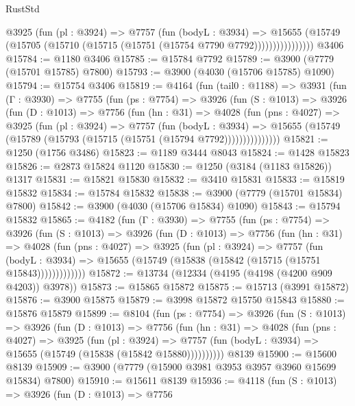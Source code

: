 \begin{lexlean}{RustStd}
\begin{coremodule}
                  @3925
                    (fun (pl : @3924) =>
                    @7757
                      (fun (bodyL : @3934) =>
                      @15655
                        (@15749 (@15705 (@15710 (@15715 (@15751 (@15754 @7790 @7792))))))))))))))))
    @3406
@15784 := @1180 @3406
@15785 := @15784 @7792
@15789 := @3900 (@7779 (@15701 @15785) @7800)
@15793 := @3900 (@4030 (@15706 @15785) @1090)
@15794 := @15754 @3406
@15819 := @4164
    (fun (tail0 : @1188) =>
    @3931
      (fun (Γ : @3930) =>
      @7755
        (fun (ps : @7754) =>
        @3926
          (fun (S : @1013) =>
          @3926
            (fun (D : @1013) =>
            @7756
              (fun (hn : @31) =>
              @4028
                (fun (pns : @4027) =>
                @3925
                  (fun (pl : @3924) =>
                  @7757
                    (fun (bodyL : @3934) =>
                    @15655 (@15749 (@15789 (@15793 (@15715 (@15751 (@15794 @7792)))))))))))))))
@15821 := @1250 (@1756 @3486)
@15823 := @1189 @3444 @8043
@15824 := @1428 @15823
@15826 := @2873 @15824 @1120
@15830 := @1250 (@3184 (@1183 @15826)) @1317
@15831 := @15821 @15830
@15832 := @3410 @15831
@15833 := @15819 @15832
@15834 := @15784 @15832
@15838 := @3900 (@7779 (@15701 @15834) @7800)
@15842 := @3900 (@4030 (@15706 @15834) @1090)
@15843 := @15794 @15832
@15865 := @4182
    (fun (Γ : @3930) =>
    @7755
      (fun (ps : @7754) =>
      @3926
        (fun (S : @1013) =>
        @3926
          (fun (D : @1013) =>
          @7756
            (fun (hn : @31) =>
            @4028
              (fun (pns : @4027) =>
              @3925
                (fun (pl : @3924) =>
                @7757
                  (fun (bodyL : @3934) =>
                  @15655 (@15749 (@15838 (@15842 (@15715 (@15751 @15843)))))))))))))
@15872 := @13734 (@12334 (@4195 (@4198 (@4200 @909 @4203)) @3978))
@15873 := @15865 @15872
@15875 := @15713 (@3991 @15872)
@15876 := @3900 @15875
@15879 := @3998 @15872 @15750 @15843
@15880 := @15876 @15879
@15899 := @8104
    (fun (ps : @7754) =>
    @3926
      (fun (S : @1013) =>
      @3926
        (fun (D : @1013) =>
        @7756
          (fun (hn : @31) =>
          @4028
            (fun (pns : @4027) =>
            @3925
              (fun (pl : @3924) =>
              @7757 (fun (bodyL : @3934) => @15655 (@15749 (@15838 (@15842 @15880))))))))))
    @8139
@15900 := @15600 @8139
@15909 := @3900 (@7779 (@15900 @3981 @3953 @3957 @3960 @15699 @15834) @7800)
@15910 := @15611 @8139
@15936 := @4118
    (fun (S : @1013) =>
    @3926
      (fun (D : @1013) =>
      @7756

\end{coremodule}
\end{lexlean}
